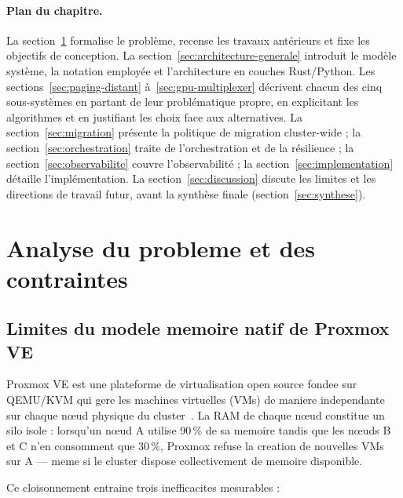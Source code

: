 \paragraph{Plan du chapitre.}
La section~\ref{sec:analyse-probleme} formalise le problème, recense les travaux antérieurs et fixe les objectifs de conception. La section~\ref{sec:architecture-generale} introduit le modèle système, la notation employée et l'architecture en couches Rust/Python. Les sections~\ref{sec:paging-distant} à~\ref{sec:gpu-multiplexer} décrivent chacun des cinq sous-systèmes en partant de leur problématique propre, en explicitant les algorithmes et en justifiant les choix face aux alternatives. La section~\ref{sec:migration} présente la politique de migration cluster-wide ; la section~\ref{sec:orchestration} traite de l'orchestration et de la résilience ; la section~\ref{sec:observabilite} couvre l'observabilité ; la section~\ref{sec:implementation} détaille l'implémentation. La section~\ref{sec:discussion} discute les limites et les directions de travail futur, avant la synthèse finale (section~\ref{sec:synthese}).

\section{Analyse du probleme et des contraintes}
\label{sec:analyse-probleme}

\subsection{Limites du modele memoire natif de Proxmox VE}
\label{subsec:limites-proxmox}

Proxmox VE est une plateforme de virtualisation open source fondee sur QEMU/KVM qui gere les machines virtuelles (VMs) de maniere independante sur chaque n\oe{}ud physique du cluster~\cite{proxmox_doc,qemu_doc,kvm_doc}. La RAM de chaque n\oe{}ud constitue un silo isole : lorsqu'un n\oe{}ud A utilise 90\,\% de sa memoire tandis que les n\oe{}uds B et C n'en consomment que 30\,\%, Proxmox refuse la creation de nouvelles VMs sur A --- meme si le cluster dispose collectivement de memoire disponible.

Ce cloisonnement entraine trois inefficacites mesurables :

